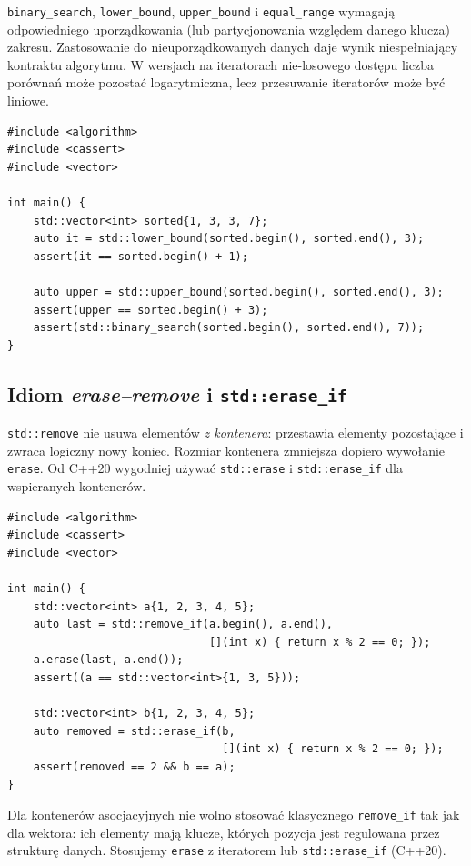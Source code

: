 \texttt{binary\_search}, \texttt{lower\_bound}, \texttt{upper\_bound}
i \texttt{equal\_range} wymagają odpowiedniego uporządkowania
(lub partycjonowania względem danego klucza) zakresu. Zastosowanie
do nieuporządkowanych danych daje wynik niespełniający kontraktu
algorytmu. W wersjach na iteratorach nie-losowego dostępu liczba
porównań może pozostać logarytmiczna, lecz przesuwanie iteratorów
może być liniowe.

\begin{lstlisting}[caption={Wyszukiwanie miejsca wstawienia w posortowanym vector (C++11); kompletny program.}]
#include <algorithm>
#include <cassert>
#include <vector>

int main() {
    std::vector<int> sorted{1, 3, 3, 7};
    auto it = std::lower_bound(sorted.begin(), sorted.end(), 3);
    assert(it == sorted.begin() + 1);

    auto upper = std::upper_bound(sorted.begin(), sorted.end(), 3);
    assert(upper == sorted.begin() + 3);
    assert(std::binary_search(sorted.begin(), sorted.end(), 7));
}
\end{lstlisting}

\subsection{Idiom \emph{erase--remove} i \texttt{std::erase\_if}}

\texttt{std::remove} nie usuwa elementów \emph{z kontenera}:
przestawia elementy pozostające i zwraca logiczny nowy koniec.
Rozmiar kontenera zmniejsza dopiero wywołanie \texttt{erase}.
Od C++20 wygodniej używać \texttt{std::erase} i
\texttt{std::erase\_if} dla wspieranych kontenerów.

\begin{lstlisting}[caption={Dwa sposoby usuwania z vector (C++20); kompletny program.}]
#include <algorithm>
#include <cassert>
#include <vector>

int main() {
    std::vector<int> a{1, 2, 3, 4, 5};
    auto last = std::remove_if(a.begin(), a.end(),
                               [](int x) { return x % 2 == 0; });
    a.erase(last, a.end());
    assert((a == std::vector<int>{1, 3, 5}));

    std::vector<int> b{1, 2, 3, 4, 5};
    auto removed = std::erase_if(b,
                                 [](int x) { return x % 2 == 0; });
    assert(removed == 2 && b == a);
}
\end{lstlisting}

Dla kontenerów asocjacyjnych nie wolno stosować klasycznego
\texttt{remove\_if} tak jak dla wektora: ich elementy mają klucze,
których pozycja jest regulowana przez strukturę danych. Stosujemy
\texttt{erase} z iteratorem lub \texttt{std::erase\_if} (C++20).

